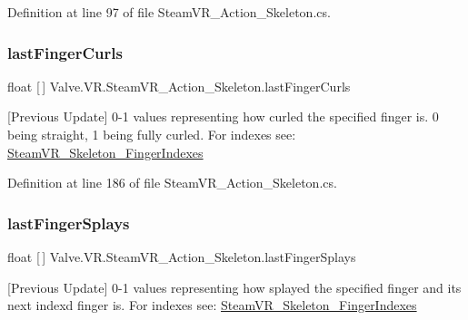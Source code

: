 Definition at line 97 of file Steam\+V\+R\+\_\+\+Action\+\_\+\+Skeleton.\+cs.

\mbox{\label{class_valve_1_1_v_r_1_1_steam_v_r___action___skeleton_abc27a8dd78d0d1a5fb582742c22bab6f}} 
\subsubsection{\texorpdfstring{lastFingerCurls}{lastFingerCurls}}
{\footnotesize\ttfamily float \mbox{[}$\,$\mbox{]} Valve.\+V\+R.\+Steam\+V\+R\+\_\+\+Action\+\_\+\+Skeleton.\+last\+Finger\+Curls\hspace{0.3cm}{\ttfamily [get]}}



\mbox{[}Previous Update\mbox{]} 0-\/1 values representing how curled the specified finger is. 0 being straight, 1 being fully curled. For indexes see\+: \mbox{\hyperlink{class_valve_1_1_v_r_1_1_steam_v_r___skeleton___finger_indexes}{Steam\+V\+R\+\_\+\+Skeleton\+\_\+\+Finger\+Indexes}} 



Definition at line 186 of file Steam\+V\+R\+\_\+\+Action\+\_\+\+Skeleton.\+cs.

\mbox{\label{class_valve_1_1_v_r_1_1_steam_v_r___action___skeleton_aae1f7b7aafe12885bc7388e2f7733ff4}} 
\subsubsection{\texorpdfstring{lastFingerSplays}{lastFingerSplays}}
{\footnotesize\ttfamily float \mbox{[}$\,$\mbox{]} Valve.\+V\+R.\+Steam\+V\+R\+\_\+\+Action\+\_\+\+Skeleton.\+last\+Finger\+Splays\hspace{0.3cm}{\ttfamily [get]}}



\mbox{[}Previous Update\mbox{]} 0-\/1 values representing how splayed the specified finger and it\textquotesingle{}s next index\textquotesingle{}d finger is. For indexes see\+: \mbox{\hyperlink{class_valve_1_1_v_r_1_1_steam_v_r___skeleton___finger_indexes}{Steam\+V\+R\+\_\+\+Skeleton\+\_\+\+Finger\+Indexes}} 



